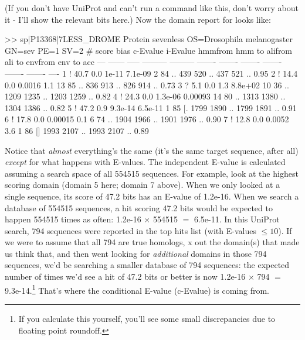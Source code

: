 
(If you don't have UniProt and can't run a command like this, don't
worry about it - I'll show the relevant bits here.) Now the domain
report for  looks like:

\begin{samepage}
\begin{sreoutput}
>> sp|P13368|7LESS_DROME  Protein sevenless OS=Drosophila melanogaster GN=sev PE=1 SV=2
   #    score  bias  c-Evalue  i-Evalue hmmfrom  hmm to    alifrom  ali to    envfrom  env to     acc
 ---   ------ ----- --------- --------- ------- -------    ------- -------    ------- -------    ----
   1 !   40.7   0.0     1e-11   7.1e-09       2      84 ..     439     520 ..     437     521 .. 0.95
   2 !   14.4   0.0    0.0016       1.1      13      85 ..     836     913 ..     826     914 .. 0.73
   3 ?    5.1   0.0       1.3   8.8e+02      10      36 ..    1209    1235 ..    1203    1259 .. 0.82
   4 !   24.3   0.0   1.3e-06   0.00093      14      80 ..    1313    1380 ..    1304    1386 .. 0.82
   5 !   47.2   0.9   9.3e-14   6.5e-11       1      85 [.    1799    1890 ..    1799    1891 .. 0.91
   6 !   17.8   0.0   0.00015       0.1       6      74 ..    1904    1966 ..    1901    1976 .. 0.90
   7 !   12.8   0.0    0.0052       3.6       1      86 []    1993    2107 ..    1993    2107 .. 0.89
\end{sreoutput}
\end{samepage}

Notice that \emph{almost} everything's the same (it's the same target
sequence, after all) \emph{except} for what happens with E-values. The
independent E-value is calculated assuming a search space of all
554515 sequences. For example, look at the highest scoring domain
(domain 5 here; domain 7 above). When we only looked at a single
sequence, its score of 47.2 bits has an E-value of 1.2e-16. When we
search a database of 554515 sequences, a hit scoring 47.2 bits would
be expected to happen 554515 times as often: 1.2e-16 $\times$ 554515
$=$ 6.5e-11. In this UniProt
search, 794 sequences were reported in the top hits list (with
E-values $\leq 10$). If we were to assume that all 794 are true
homologs, x out the domain(s) that made us think that, and then went
looking for \emph{additional} domains in those 794 sequences, we'd be
searching a smaller database of 794 sequences: the expected number of
times we'd see a hit of 47.2 bits or better is now 1.2e-16 $\times$
794 $=$ 9.3e-14.\footnote{If you calculate this yourself, you'll see some small discrepancies
due to floating point roundoff.} That's where the conditional E-value (c-Evalue) is
coming from.

